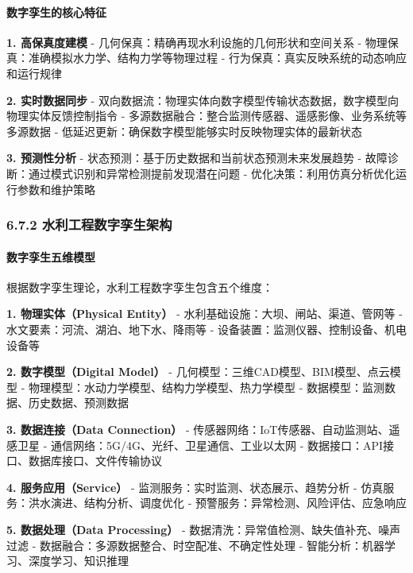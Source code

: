 \paragraph{数字孪生的核心特征}\label{ux6570ux5b57ux5b6aux751fux7684ux6838ux5fc3ux7279ux5f81}

\textbf{1. 高保真度建模} - 几何保真：精确再现水利设施的几何形状和空间关系 - 物理保真：准确模拟水力学、结构力学等物理过程 - 行为保真：真实反映系统的动态响应和运行规律

\textbf{2. 实时数据同步} - 双向数据流：物理实体向数字模型传输状态数据，数字模型向物理实体反馈控制指令 - 多源数据融合：整合监测传感器、遥感影像、业务系统等多源数据 - 低延迟更新：确保数字模型能够实时反映物理实体的最新状态

\textbf{3. 预测性分析} - 状态预测：基于历史数据和当前状态预测未来发展趋势 - 故障诊断：通过模式识别和异常检测提前发现潜在问题 - 优化决策：利用仿真分析优化运行参数和维护策略

\subsubsection{6.7.2 水利工程数字孪生架构}\label{ux6c34ux5229ux5de5ux7a0bux6570ux5b57ux5b6aux751fux67b6ux6784}

\paragraph{数字孪生五维模型}\label{ux6570ux5b57ux5b6aux751fux4e94ux7ef4ux6a21ux578b}

根据数字孪生理论，水利工程数字孪生包含五个维度：

\textbf{1. 物理实体（Physical Entity）} - 水利基础设施：大坝、闸站、渠道、管网等 - 水文要素：河流、湖泊、地下水、降雨等 - 设备装置：监测仪器、控制设备、机电设备等

\textbf{2. 数字模型（Digital Model）} - 几何模型：三维CAD模型、BIM模型、点云模型 - 物理模型：水动力学模型、结构力学模型、热力学模型 - 数据模型：监测数据、历史数据、预测数据

\textbf{3. 数据连接（Data Connection）} - 传感器网络：IoT传感器、自动监测站、遥感卫星 - 通信网络：5G/4G、光纤、卫星通信、工业以太网 - 数据接口：API接口、数据库接口、文件传输协议

\textbf{4. 服务应用（Service）} - 监测服务：实时监测、状态展示、趋势分析 - 仿真服务：洪水演进、结构分析、调度优化 - 预警服务：异常检测、风险评估、应急响应

\textbf{5. 数据处理（Data Processing）} - 数据清洗：异常值检测、缺失值补充、噪声过滤 - 数据融合：多源数据整合、时空配准、不确定性处理 - 智能分析：机器学习、深度学习、知识推理

